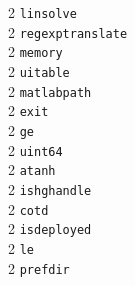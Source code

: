 \begin{footnotesize}
\begin{multicols}{3}
\vspace{-.153cm} 2     \hspace{.2cm} {\tt linsolve            }   \\ %
\vspace{-.153cm} 2     \hspace{.2cm} {\tt regexptranslate     }   \\ %
\vspace{-.153cm} 2     \hspace{.2cm} {\tt memory              }   \\ %
\vspace{-.153cm} 2     \hspace{.2cm} {\tt uitable             }   \\ %
\vspace{-.153cm} 2     \hspace{.2cm} {\tt matlabpath          }   \\ %
\vspace{-.153cm} 2     \hspace{.2cm} {\tt exit                }   \\ %
\vspace{-.153cm} 2     \hspace{.2cm} {\tt ge                  }   \\ %
\vspace{-.153cm} 2     \hspace{.2cm} {\tt uint64              }   \\ %
\vspace{-.153cm} 2     \hspace{.2cm} {\tt atanh               }   \\ %
\vspace{-.153cm} 2     \hspace{.2cm} {\tt ishghandle          }   \\ %
\vspace{-.153cm} 2     \hspace{.2cm} {\tt cotd                }   \\ %
\vspace{-.153cm} 2     \hspace{.2cm} {\tt isdeployed          }   \\ %
\vspace{-.153cm} 2     \hspace{.2cm} {\tt le                  }   \\ %
\vspace{-.153cm} 2     \hspace{.2cm} {\tt prefdir             }   \\ %

\end{multicols}
\end{footnotesize}
